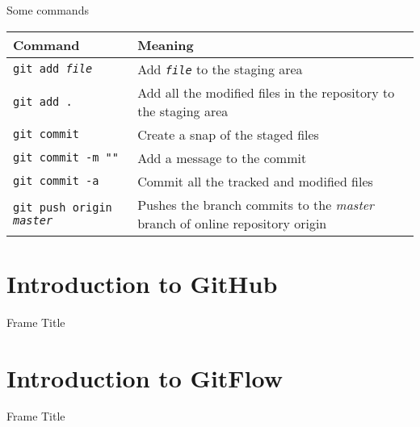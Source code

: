 \documentclass{beamer}
\begin{document}
\begin{frame}{Some commands}
\begin{center}
\footnotesize
\begin{tabular}{p{}p{}}
    \toprule
    \alert{Command}	&	\alert{Meaning}\\
    \midrule
    \texttt{git add \textit{file}}	&	Add \texttt{\textit{file}} to the staging area\\
    \texttt{git add .}	&	Add all the modified files in the repository to the staging area\\
    \texttt{git commit}	&	Create a snap of the staged files\\
    \texttt{git commit -m \textit{""}} & Add a message to the commit\\
    \texttt{git commit -a} & Commit all the tracked and modified files\\
    \texttt{git push origin \textit{master}}	& Pushes the branch commits to the \textit{master} branch of online repository origin\\
    \bottomrule
\end{tabular}
\end{center}
\end{frame}

\section{Introduction to GitHub}
\begin{frame}{Frame Title}
\end{frame}

\section{Introduction to GitFlow}
\begin{frame}{Frame Title}
\end{frame}
\end{document}
